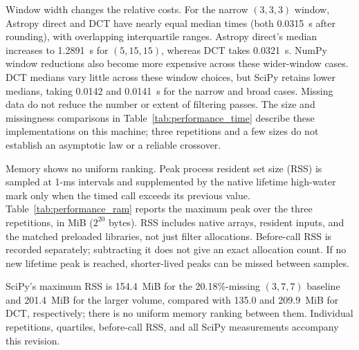 \documentclass[a4paper,fleqn]{cas-sc}
\begin{document}
Window width changes the relative costs. For the narrow $(3,3,3)$ window, Astropy direct and DCT have nearly equal median times (both 0.0315~s after rounding), with overlapping interquartile ranges. Astropy direct's median increases to 1.2891~s for $(5,15,15)$, whereas DCT takes 0.0321~s. NumPy window reductions also become more expensive across these wider-window cases. DCT medians vary little across these window choices, but SciPy retains lower medians, taking 0.0142 and 0.0141~s for the narrow and broad cases. Missing data do not reduce the number or extent of filtering passes. The size and missingness comparisons in Table~\ref{tab:performance_time} describe these implementations on this machine; three repetitions and a few sizes do not establish an asymptotic law or a reliable crossover.

Memory shows no uniform ranking. Peak process resident set size (RSS) is sampled at 1-ms intervals and supplemented by the native lifetime high-water mark only when the timed call exceeds its previous value. Table~\ref{tab:performance_ram} reports the maximum peak over the three repetitions, in MiB ($2^{20}$ bytes). RSS includes native arrays, resident inputs, and the matched preloaded libraries, not just filter allocations. Before-call RSS is recorded separately; subtracting it does not give an exact allocation count. If no new lifetime peak is reached, shorter-lived peaks can be missed between samples.

SciPy's maximum RSS is 154.4~MiB for the 20.18\%-missing $(3,7,7)$ baseline and 201.4~MiB for the larger volume, compared with 135.0 and 209.9~MiB for DCT, respectively; there is no uniform memory ranking between them. Individual repetitions, quartiles, before-call RSS, and all SciPy measurements accompany this revision.
\end{document}
